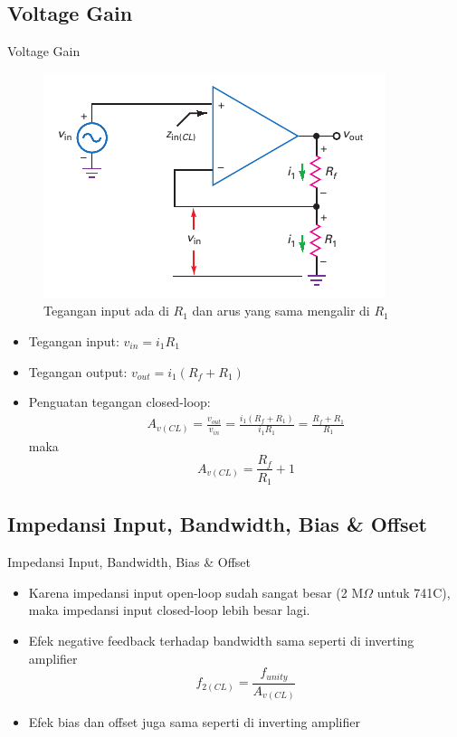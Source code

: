 \subsection{Voltage Gain}
\begin{frame}{Voltage Gain}
	\begin{multicols}{2}
		\begin{figure}
			\centering
			\includegraphics[width=\linewidth]{gambar/fig-16.20}
			\caption{Tegangan input ada di $ R_1 $ dan arus yang sama mengalir di $ R_1 $}
			\label{fig-16.20}
		\end{figure}
		\columnbreak
		\begin{itemize}
			\item Tegangan input: $ v_{in} = i_1 R_1 $
			\item Tegangan output: $ v_{out} = i_1 (R_f + R_1) $
			\item Penguatan tegangan closed-loop:
			\begin{align*}
				A_{v(CL)} = \frac{v_{out}}{v_{in}} = \frac{i_1 (R_f + R_1)}{i_1 R_1} = \frac{R_f + R_1}{R_1}
			\end{align*}
			maka
			\begin{equation}\label{pers.16.12}
				A_{v(CL)} = \frac{R_f}{R_1} + 1
			\end{equation}
		\end{itemize}
	\end{multicols}
\end{frame}

\subsection{Impedansi Input, Bandwidth, Bias \& Offset}
\begin{frame}{Impedansi Input, Bandwidth, Bias \& Offset}
	\begin{itemize}
		\item Karena impedansi input open-loop sudah sangat besar (2 M$ \Omega $ untuk 741C), maka impedansi input closed-loop lebih besar lagi.
		\item Efek negative feedback terhadap bandwidth sama seperti di inverting amplifier
		\[ f_{2(CL)} = \frac{f_{unity}}{A_{v(CL)}} \]
		\item Efek bias dan offset juga sama seperti di inverting amplifier
	\end{itemize}
\end{frame}

